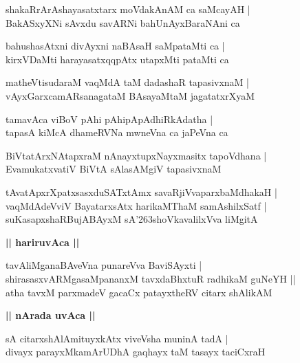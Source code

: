 \documentclass[twoside,12pt,openright]{book}
\def\S{\char'263}
\newcounter{shloka}[chapter]
\def\uvaca#1{\centerline{{\large\textbf{#1}}}}
\begin{document}
\begin{shloka}%
shakaRrArAshayasatxtarx moVdakAnAM ca saMcayAH |\\
BakASxyXNi sAvxdu savARNi bahUnAyxBaraNAni ca 
\end{shloka}

\begin{shloka}%
bahushasAtxni divAyxni naBAsaH saMpataMti ca |\\
kirxVDaMti harayasatxqqpAtx utapxMti pataMti ca 
\end{shloka}

\begin{shloka}%
matheVtisudaraM vaqMdA taM dadashaR tapasivxnaM |\\
vAyxGarxcamARsanagataM BAsayaMtaM jagatatxrXyaM 
\end{shloka}

\begin{shloka}%
tamavAca viBoV pAhi pAhipApAdhiRkAdatha |\\
tapasA kiMcA dhameRVNa mwneVna ca jaPeVna ca 
\end{shloka}

\begin{shloka}%
BiVtatArxNAtapxraM nAnayxtupxNayxmasitx tapoVdhana |\\
EvamukatxvatiV BiVtA sAlasAMgiV tapasivxnaM
\end{shloka}

\begin{shloka}%
tAvatApxrXpatxsasxduSATxtAmx savaRjiVvaparxbaMdhakaH |\\
vaqMdAdeVviV BayatarxsAtx harikaMThaM samAshilxSatf |\\
suKasapxshaRBujABAyxM sA\S shoVkavalilxVva liMgitA 
\end{shloka}

\uvaca{|| hariruvAca ||}

\begin{shloka}%
tavAliMganaBAveVna punareVva BaviSAyxti |\\
shirasasxvARMgasaMpananxM tavxdaBhxtuR radhikaM guNeYH ||\\
atha tavxM parxmadeV gacaCx patayxtheRV citarx shAlikAM 
\end{shloka}

\uvaca{|| nArada uvAca ||}

\begin{shloka}%
sA citarxshAlAmituyxkAtx viveVsha muninA tadA |\\
divayx parayxMkamArUDhA gaqhayx taM tasayx taciCxraH 
\end{shloka}
\end{document}
